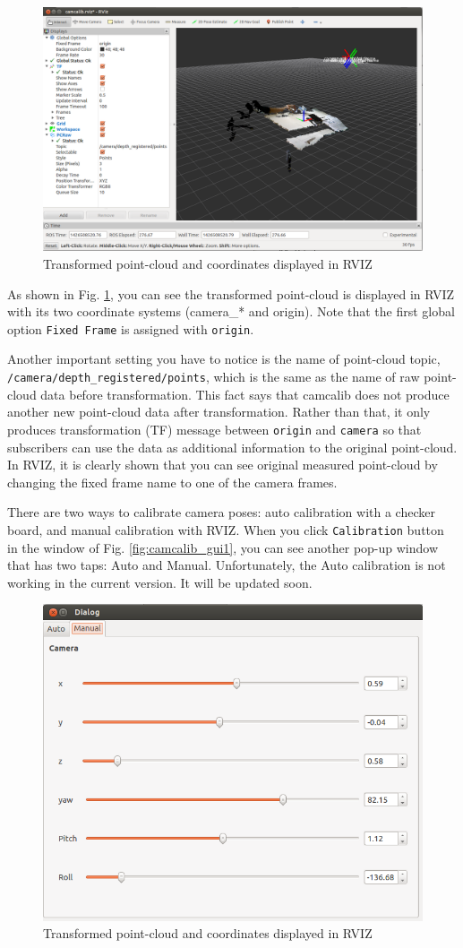 \documentclass[a4paper,twoside, openright,12pt]{report}
\begin{document}
\begin{figure}[t]
	\centering
	\includegraphics[width=\linewidth]{fig/camcalib_gui2.png}
	\caption{Transformed point-cloud and coordinates displayed in RVIZ}
	\label{fig:camcalib_gui2}
\end{figure}

As shown in Fig. \ref{fig:camcalib_gui2}, you can see the transformed point-cloud is displayed in RVIZ with its two coordinate systems (camera\_* and origin). Note that the first global option \verb|Fixed Frame| is assigned with \verb|origin|. 

Another important setting you have to notice is the name of point-cloud topic, \verb|/camera/depth_registered/points|, which is the same as the name of raw point-cloud data before transformation. This fact says that camcalib does not produce another new point-cloud data after transformation. Rather than that, it only produces transformation (TF) message between \verb|origin| and \verb|camera| so that subscribers can use the data as additional information to the original point-cloud. In RVIZ, it is clearly shown that you can see original measured point-cloud by changing the fixed frame name to one of the camera frames.  

There are two ways to calibrate camera poses: auto calibration with a checker board, and manual calibration with RVIZ. When you click \verb|Calibration| button in the window of Fig. \ref{fig:camcalib_gui1}, you can see another pop-up window that has two taps: Auto and Manual.
Unfortunately, the Auto calibration is not working in the current version. It will be updated soon. 

\begin{figure}[t]
	\centering
	\includegraphics[width=0.5\linewidth]{fig/camcalib_gui3.png}
	\caption{Transformed point-cloud and coordinates displayed in RVIZ}
	\label{fig:camcalib_gui3}
\end{figure}
\end{document}
